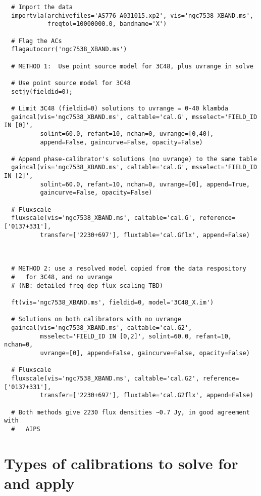 \small
\begin{verbatim}
  # Import the data
  importvla(archivefiles='AS776_A031015.xp2', vis='ngc7538_XBAND.ms',
            freqtol=10000000.0, bandname='X')

  # Flag the ACs
  flagautocorr('ngc7538_XBAND.ms')

  # METHOD 1:  Use point source model for 3C48, plus uvrange in solve

  # Use point source model for 3C48
  setjy(fieldid=0);

  # Limit 3C48 (fieldid=0) solutions to uvrange = 0-40 klambda
  gaincal(vis='ngc7538_XBAND.ms', caltable='cal.G', msselect='FIELD_ID IN [0]',
          solint=60.0, refant=10, nchan=0, uvrange=[0,40], 
          append=False, gaincurve=False, opacity=False)

  # Append phase-calibrator's solutions (no uvrange) to the same table
  gaincal(vis='ngc7538_XBAND.ms', caltable='cal.G', msselect='FIELD_ID IN [2]', 
          solint=60.0, refant=10, nchan=0, uvrange=[0], append=True,
          gaincurve=False, opacity=False)

  # Fluxscale
  fluxscale(vis='ngc7538_XBAND.ms', caltable='cal.G', reference=['0137+331'],
          transfer=['2230+697'], fluxtable='cal.Gflx', append=False)



  # METHOD 2: use a resolved model copied from the data respository
  #   for 3C48, and no uvrange
  # (NB: detailed freq-dep flux scaling TBD)

  ft(vis='ngc7538_XBAND.ms', fieldid=0, model='3C48_X.im')

  # Solutions on both calibrators with no uvrange
  gaincal(vis='ngc7538_XBAND.ms', caltable='cal.G2',
          msselect='FIELD_ID IN [0,2]', solint=60.0, refant=10, nchan=0,
          uvrange=[0], append=False, gaincurve=False, opacity=False)

  # Fluxscale
  fluxscale(vis='ngc7538_XBAND.ms', caltable='cal.G2', reference=['0137+331'],
          transfer=['2230+697'], fluxtable='cal.G2flx', append=False)

  # Both methods give 2230 flux densities ~0.7 Jy, in good agreement with
  #   AIPS
\end{verbatim}
\normalsize


\section{Types of calibrations to solve for and apply}
\label{section:synth.cal.types}

